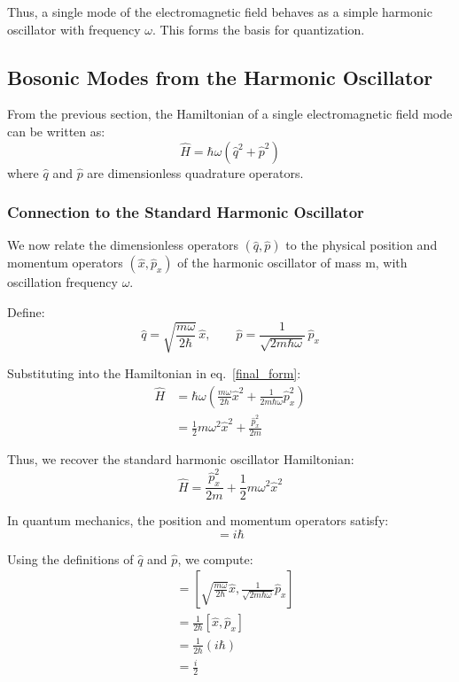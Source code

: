 Thus, a single mode of the electromagnetic field behaves as a simple harmonic oscillator with frequency $\omega$. This forms the basis for quantization.




\subsection{Bosonic Modes from the Harmonic Oscillator}

From the previous section, the Hamiltonian of a single electromagnetic field mode can be written as:
\begin{equation*}
\hat{H} = \hbar \omega (\hat{q}^2 + \hat{p}^2)
\end{equation*}
where $\hat{q}$ and $\hat{p}$ are dimensionless quadrature operators.
\subsubsection{Connection to the Standard Harmonic Oscillator}

We now relate the dimensionless operators $(\hat{q}, \hat{p})$ to the physical position and momentum operators $(\hat{x}, \hat{p}_x)$ of the harmonic oscillator of mass m, with oscillation frequency $\omega$.

Define:
\begin{equation}
\hat{q} = \sqrt{\frac{m\omega}{2\hbar}} \, \hat{x}, 
\qquad
\hat{p} = \frac{1}{\sqrt{2m\hbar\omega}} \, \hat{p}_x
\end{equation}

Substituting into the Hamiltonian in eq.~\eqref{final_form}:
\begin{align*}
\hat{H}
&= \hbar \omega \left(
\frac{m\omega}{2\hbar} \hat{x}^2
+
\frac{1}{2m\hbar\omega} \hat{p}_x^2
\right) \\
&= \frac{1}{2} m\omega^2 \hat{x}^2 + \frac{\hat{p}_x^2}{2m}
\end{align*}

Thus, we recover the standard harmonic oscillator Hamiltonian:
\begin{equation*}
\hat{H} = \frac{\hat{p}_x^2}{2m} + \frac{1}{2} m\omega^2 \hat{x}^2
\end{equation*}

In quantum mechanics, the position and momentum operators satisfy:
\begin{equation*}
[\hat{x}, \hat{p}_x] = i\hbar
\end{equation*}

Using the definitions of $\hat{q}$ and $\hat{p}$, we compute:
\begin{align*}
[\hat{q}, \hat{p}]
&= \left[ 
\sqrt{\frac{m\omega}{2\hbar}} \hat{x},
\frac{1}{\sqrt{2m\hbar\omega}} \hat{p}_x
\right] \\
&= \frac{1}{2\hbar} [\hat{x}, \hat{p}_x] \\
&= \frac{1}{2\hbar} (i\hbar) \\
&= \frac{i}{2}
\end{align*}

